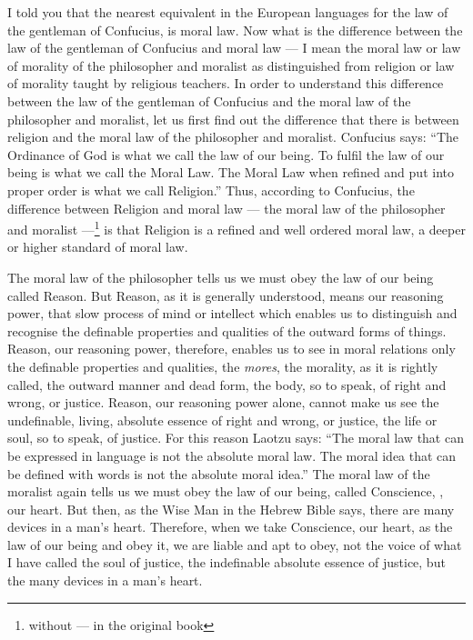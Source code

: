 I told you that the nearest equivalent in the European languages for the law of the gentleman of Confucius, is moral law.
Now what is the difference between the law of the gentleman of Confucius and moral law --- I mean the moral law or law of morality of the philosopher and moralist as distinguished from religion or law of morality taught by religious teachers.
In order to understand this difference between the law of the gentleman of Confucius and the moral law of the philosopher and moralist, let us first find out the difference that there is between religion and the moral law of the philosopher and moralist.
Confucius says: ``The Ordinance of God is what we call the law of our being. To fulfil the law of our being is what we call the Moral Law. The Moral Law when refined and put into proper order is what we call Religion.''\cite{num19}
Thus, according to Confucius, the difference between Religion and moral law --- the moral law of the philosopher and moralist ---\footnote{without --- in the original book} is that Religion is a refined and well ordered moral law, a deeper or higher standard of moral law.

The moral law of the philosopher tells us we must obey the law of our being called Reason.
But Reason, as it is generally understood, means our reasoning power, that slow process of mind or intellect which enables us to distinguish and recognise the definable properties and qualities of the outward forms of things.
Reason, our reasoning power, therefore, enables us to see in moral relations only the definable properties and qualities, the \emph{mores}, the morality, as it is rightly called, the outward manner and dead form, the body, so to speak, of right and wrong, or justice.
Reason, our reasoning power alone, cannot make us see the undefinable, living, absolute essence of right and wrong, or justice, the life or soul, so to speak, of justice.
For this reason Laotzu says: ``The moral law that can be expressed in language is not the absolute moral law. The moral idea that can be defined with words is not the absolute moral idea.''\cite{num20}
The moral law of the moralist again tells us we must obey the law of our being, called Conscience, \ie, our heart.
But then, as the Wise Man in the Hebrew Bible says, there are many devices in a man's heart.
Therefore, when we take Conscience, our heart, as the law of our being and obey it, we are liable and apt to obey, not the voice of what I have called the soul of justice, the indefinable absolute essence of justice, but the many devices in a man's heart.


